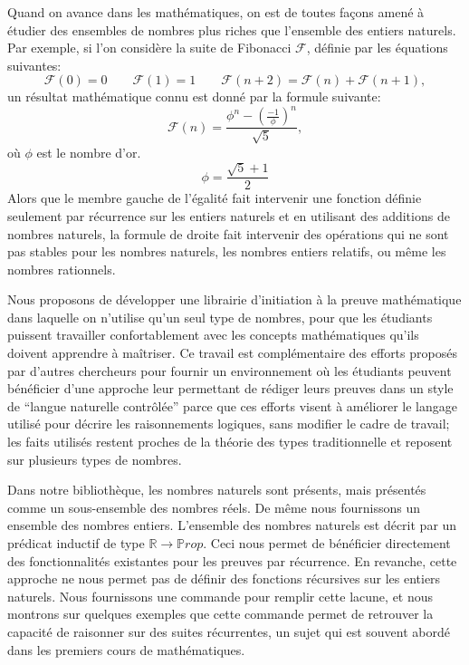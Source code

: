 \documentclass{jflart}
\begin{document}
Quand on avance dans les mathématiques, on est de toutes façons amené à
étudier des ensembles de nombres plus riches que l'ensemble des
entiers naturels.  Par exemple, si l'on considère la suite de
Fibonacci \({\mathcal F}\), définie par les équations suivantes:
\[{\mathcal F}(0) = 0 \qquad {\mathcal F}(1)= 1\qquad {\mathcal F}(n +
2) = {\mathcal F}(n) + {\mathcal F}(n + 1),\]
un résultat mathématique connu est donné par la formule suivante:
\[{\mathcal F} (n) = \frac{\phi ^n - ({\frac{-1}{\phi}}) ^
  n}{\sqrt{5}},\]
où \(\phi\) est le nombre d'or.
\[\phi = \frac{\sqrt{5} + 1}{2}\]
Alors que le membre gauche de l'égalité fait intervenir une fonction définie
seulement par récurrence sur les entiers naturels et en utilisant des
additions de nombres naturels, la formule de droite fait intervenir des
opérations qui ne sont pas stables pour les nombres naturels, les nombres
entiers relatifs, ou même les nombres rationnels.

Nous proposons de développer une librairie d'initiation à la preuve %
mathématique dans laquelle on n'utilise qu'un seul type de nombres,
pour que les étudiants puissent travailler confortablement avec les
concepts mathématiques qu'ils doivent apprendre à maîtriser.  Ce
travail est complémentaire des efforts proposés par d'autres
chercheurs pour fournir un environnement où les étudiants peuvent
bénéficier d'une approche leur permettant de rédiger leurs preuves
dans un style de ``langue naturelle contrôlée'' parce que ces efforts
visent à améliorer le langage utilisé pour décrire les raisonnements
logiques, sans modifier le cadre de travail; les faits utilisés
restent proches de la théorie des types traditionnelle et reposent sur
plusieurs types de nombres.

Dans notre bibliothèque, les nombres naturels sont présents, mais
présentés comme un sous-ensemble des nombres réels.  De même nous
fournissons un ensemble des nombres entiers.  L'ensemble des
nombres naturels est
décrit par un prédicat inductif de type \({\mathbb R} \rightarrow
{\mathbb Prop}\).  Ceci nous permet de bénéficier directement des
fonctionnalités existantes pour les preuves par récurrence.  En
revanche, cette approche ne nous permet pas de définir des fonctions
récursives sur les entiers naturels.  Nous fournissons une commande
pour remplir cette lacune, et nous montrons sur quelques exemples que
cette commande permet de retrouver la capacité de raisonner sur des suites
récurrentes, un sujet qui est souvent abordé dans les premiers
cours de mathématiques.
\end{document}
